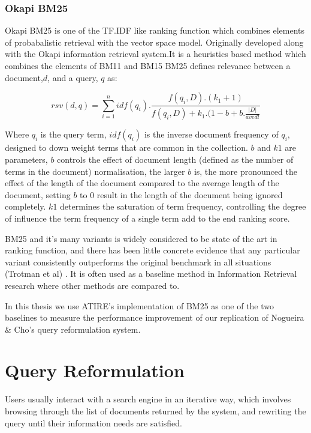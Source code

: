 \subsubsection{Okapi BM25}

Okapi BM25 is one of the TF.IDF like ranking function which combines elements of probabalistic retrieval with the vector space model. Originally developed along with the Okapi information retrieval system.It is a heuristics based method which combines the elements of BM11 and BM15 \cite{robertson1995okapi} BM25 defines relevance between a document,$d$, and a query, $q$ as:

\begin{equation}
    rsv(d,q) = \sum_{i=1}^{n} idf(q_i).\frac{f(q_i,D).(k_1 + 1)}{f(q_i,D) + k_1.(1-b+b.\frac{|D|}{avedl}}
\end{equation}

Where $q_i$ is the query term, $idf(q_i)$ is the inverse document frequency of $q_i$, designed to down weight terms that are common in the collection. $b$ and $k1$ are parameters,  $b$ controls the effect of document length (defined as the number of terms in the document) normalisation, the larger $b$ is, the more pronounced the effect of the length of the document compared to the average length of the document,  setting $b$  to 0 result in the length of the document being ignored completely. $k1$ determines the saturation of term frequency, controlling the degree of influence the term frequency of a single term add to the end ranking score. 

BM25 and it's many variants is widely considered to be state of the art in ranking function, and there has been little concrete evidence that any particular variant consistently outperforms the original benchmark in all situations (Trotman et al) \cite{trotman2014improvements}. It is often used as a baseline method in Information Retrieval research where other methods are compared to. 

In this thesis we use ATIRE's implementation of BM25 as one of the two baselines to measure the performance improvement of our replication of Nogueira \& Cho's query reformulation system. 


\section{Query Reformulation}
Users usually interact with a search engine in an iterative way, which involves browsing through the list of documents returned by the system, and rewriting the query until their information needs are satisfied. 

